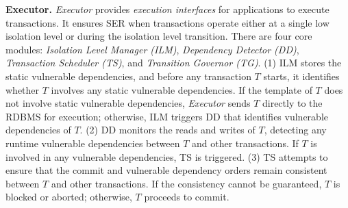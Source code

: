 {\noindent\textbf{Executor.} 
\textit{Executor} provides \textit{execution interfaces} for applications to execute transactions. It ensures SER when transactions operate either at a single low isolation level or during the isolation level transition. 
There are four core modules: \textit{Isolation Level Manager (ILM)}, \textit{Dependency Detector (DD)}, \textit{Transaction Scheduler (TS)}, and \textit{Transition Governor (TG)}. 
(1) ILM stores the static vulnerable dependencies, and before any transaction $T$ starts, it identifies whether $T$ involves any static vulnerable dependencies. If the template of $T$ does not involve static vulnerable dependencies, \textit{Executor} sends $T$ directly to the RDBMS for execution; otherwise, ILM triggers DD that identifies vulnerable dependencies of $T$.
(2) DD monitors the reads and writes of $T$, detecting any runtime vulnerable dependencies between $T$ and other transactions. If $T$ is involved in any vulnerable dependencies, TS is triggered. 
(3) TS attempts to ensure that the commit and vulnerable dependency orders remain consistent between $T$ and other transactions. If the consistency cannot be guaranteed, $T$ is blocked or aborted; otherwise, $T$ proceeds to commit.
}
